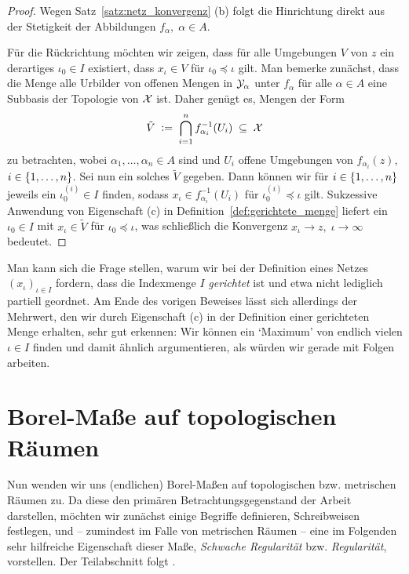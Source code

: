 \documentclass[../thesis/thesis.tex]{subfiles}
\begin{document}
	\begin{proof}
		Wegen Satz~\ref{satz:netz_konvergenz} (b) folgt die Hinrichtung direkt aus der Stetigkeit der Abbildungen $f_\alpha, \; \alpha \in A$.
		
		Für die Rückrichtung möchten wir zeigen, dass für alle Umgebungen $V$ von $z$ ein derartiges $\iota_0 \in I$ existiert, dass $x_\iota \in V$ für $\iota_0 \preceq \iota$ gilt.
		Man bemerke zunächst, dass die Menge alle Urbilder von offenen Mengen in $\mathcal{Y}_\alpha$ unter $f_\alpha$ für alle $\alpha \in A$ eine Subbasis der Topologie von $\mathcal{X}$ ist.
		Daher genügt es, Mengen der Form
		\[ \tilde{V} \; \vcentcolon = \; \bigcap_{i=1}^{n} f_{\alpha_i}^{-1}(U_i) \; \subseteq \; \mathcal{X} \]
		zu betrachten, wobei $\alpha_1, \dots, \alpha_n \in A$ sind und $U_i$ offene Umgebungen von $f_{\alpha_i}(z)$, $i \in \left\{1, \dots, n\right\}$.
		Sei nun ein solches $\tilde{V}$ gegeben. Dann können wir für $i \in \left\{1, \dots, n\right\}$ jeweils ein $\iota_0^{(i)} \in I$ finden, sodass $x_\iota \in f_{\alpha_i}^{-1}(U_i)$ für 
		$\iota_0^{(i)} \preceq \iota$ gilt. Sukzessive Anwendung von Eigenschaft (c) in Definition~\ref{def:gerichtete_menge} liefert ein $\iota_0 \in I$ mit 
		$x_\iota \in \tilde{V}$ für $\iota_0 \preceq \iota$, was schließlich die Konvergenz $x_\iota \to z, \; \iota \to \infty$ bedeutet.
	\end{proof}

	\begin{Bemerkung}
		Man kann sich die Frage stellen, warum wir bei der Definition eines Netzes $(x_\iota)_{\iota \in I}$ fordern, dass die Indexmenge $I$ \emph{gerichtet} ist und etwa nicht lediglich
		partiell geordnet. Am Ende des vorigen Beweises lässt sich allerdings der Mehrwert, den wir durch Eigenschaft (c) in der Definition einer gerichteten Menge erhalten, sehr gut erkennen: 
		Wir können ein \enquote*{Maximum} 
		von endlich vielen $\iota \in I$ finden und damit ähnlich argumentieren, als würden wir gerade mit Folgen arbeiten.
	\end{Bemerkung}
	
	\section{Borel-Maße auf topologischen Räumen}
	\label{subsec:borel-maße_auf_topologischen_räumen}
	
	Nun wenden wir uns (endlichen) Borel-Maßen auf topologischen bzw. metrischen Räumen zu. Da diese den primären Betrachtungsgegenstand der
	Arbeit darstellen, möchten wir zunächst einige Begriffe definieren, Schreibweisen festlegen, und -- zumindest im Falle von metrischen Räumen -- eine im Folgenden sehr 
	hilfreiche Eigenschaft dieser Maße, \emph{Schwache Regularität} bzw. \emph{Regularität}, vorstellen.
	Der Teilabschnitt folgt \cite[Kapitel 4.14]{Simon.2015}.
	
\end{document}
